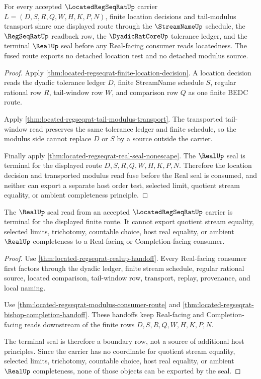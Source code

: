 \begin{theorem}
\label{thm:located-regseqrat-window-modulus-fusion}
For every accepted $\LocatedRegSeqRatUp$ carrier
$L=(D,S,R,Q,W,H,K,P,N)$, finite location decisions and tail-modulus transport
share one displayed route through the $\StreamNameUp$ schedule, the
$\RegSeqRatUp$ readback row, the $\DyadicRatCoreUp$ tolerance ledger, and the
terminal $\RealUp$ seal before any Real-facing consumer reads locatedness. The
fused route exports no detached location test and no detached modulus source.
\end{theorem}
\begin{proof}
Apply \autoref{thm:located-regseqrat-finite-location-decision}. A location
decision reads the dyadic tolerance ledger $D$, finite StreamName schedule $S$,
regular rational row $R$, tail-window row $W$, and comparison row $Q$ as one
finite BEDC route.

Apply \autoref{thm:located-regseqrat-tail-modulus-transport}. The transported
tail-window read preserves the same tolerance ledger and finite schedule, so
the modulus side cannot replace $D$ or $S$ by a source outside the carrier.

Finally apply \autoref{thm:located-regseqrat-real-seal-nonescape}. The
$\RealUp$ seal is terminal for the displayed route $D,S,R,Q,W,H,K,P,N$.
Therefore the location decision and transported modulus read fuse before the
Real seal is consumed, and neither can export a separate host order test,
selected limit, quotient stream equality, or ambient completeness principle.
\end{proof}

\begin{theorem}
\label{thm:located-regseqrat-real-seal-nonescape}
The $\RealUp$ seal read from an accepted $\LocatedRegSeqRatUp$ carrier is terminal for the displayed finite route. It cannot export quotient stream equality, selected limits, trichotomy, countable choice, host real equality, or ambient $\RealUp$ completeness to a Real-facing or Completion-facing consumer.
\end{theorem}
\begin{proof}
Use \autoref{thm:located-regseqrat-realup-handoff}. Every Real-facing consumer first factors through the dyadic ledger, finite stream schedule, regular rational source, located comparison, tail-window row, transport, replay, provenance, and local naming.

Use \autoref{thm:located-regseqrat-modulus-consumer-route} and \autoref{thm:located-regseqrat-bishop-completion-handoff}. These handoffs keep Real-facing and Completion-facing reads downstream of the finite rows $D,S,R,Q,W,H,K,P,N$.

The terminal seal is therefore a boundary row, not a source of additional host principles. Since the carrier has no coordinate for quotient stream equality, selected limits, trichotomy, countable choice, host real equality, or ambient $\RealUp$ completeness, none of those objects can be exported by the seal.
\end{proof}

